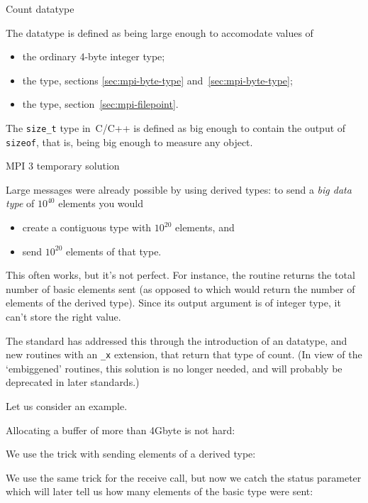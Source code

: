 
 {Count datatype}

The  datatype is defined as being large enough
to accomodate values of
\begin{itemize}
\item the ordinary 4-byte integer type;
\item the  type, sections
  \ref{sec:mpi-byte-type} and~\ref{sec:mpi-byte-type};
\item the  type, section~\ref{sec:mpi-filepoint}.
\end{itemize}

The \lstinline+size_t+ type in~C/C++ is defined as big enough to
contain the output of \lstinline+sizeof+, that is,
being big enough to measure any object.

 {MPI 3 temporary solution}

Large messages were already possible by using 
derived types: to send
a \emph{big data type} of $10^{40}$ elements you would
\begin{itemize}
\item create a contiguous type with $10^{20}$ elements, and
\item send $10^{20}$ elements of that type.
\end{itemize}
This often works, but it's not perfect. For instance, the routine
 returns the total number of basic elements sent
(as opposed to  which would return the number
of elements of the derived type). Since its output argument is
of integer type, it can't store the right value.

The  standard has addressed this
through the introduction of an  datatype,
and new routines with an \lstinline{_x} extension,
that return that type of count.
(In view of the `embiggened' routines, this solution
is no longer needed, and will probably be deprecated in later standards.)

Let us consider an example.

Allocating a buffer of more than 4Gbyte is not hard:

We use the trick with sending elements of a derived type:

We use the same trick for the receive call, but now we catch the status
parameter which will later tell us how many elements of the basic type
were sent:
%

